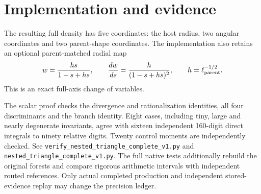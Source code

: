 \documentclass[11pt]{article}
\begin{document}
\section{Implementation and evidence}
The resulting full density has five coordinates: the host radius, two
angular coordinates and two parent-shape coordinates. The implementation
also retains an optional parent-matched radial map
\[
 w=\frac{hs}{1-s+hs},\qquad
 \frac{dw}{ds}=\frac{h}{(1-s+hs)^2},\qquad
 h=\ell_{\rm parent}^{-1/2}.
\]
This is an exact full-axis change of variables.

The scalar proof checks the divergence and rationalization identities,
all four discriminants and the branch identity. Eight cases, including
tiny, large and nearly degenerate invariants, agree with sixteen
independent 160-digit direct integrals to ninety relative digits.
Twenty control moments are independently checked.
See \texttt{verify\_nested\_triangle\_complete\_v1.py} and
\texttt{nested\_triangle\_complete\_v1.py}.
The full native tests additionally rebuild the original forests and
compare rigorous arithmetic intervals with independent routed references.
Only actual completed production and independent stored-evidence replay
may change the precision ledger.
\end{document}
